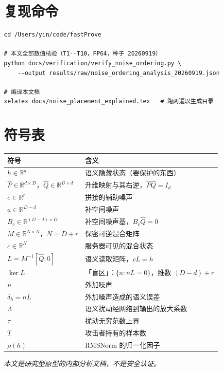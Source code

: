 \documentclass[UTF8, fontset=macnew, 11pt]{ctexart}
\newcommand{\kerL}{\ker L}
\newcommand{\Ph}{\hat P}
\newcommand{\Qh}{\hat Q}
\begin{document}
\appendix
\section{复现命令}\label{sec:repro}

\begin{verbatim}
cd /Users/yin/code/fastProve

# 本文全部数值核验（T1--T10，FP64，种子 20260919）
python docs/verification/verify_noise_ordering.py \
    --output results/raw/noise_ordering_analysis_20260919.json

# 编译本文档
xelatex docs/noise_placement_explained.tex   # 跑两遍以生成目录
\end{verbatim}

\section{符号表}

\begin{center}
\small
\renewcommand{\arraystretch}{1.25}
\begin{tabular}{@{}l l@{}}
\toprule
符号 & 含义 \\
\midrule
$h\in\mathbb R^d$ & 语义隐藏状态（要保护的东西） \\
$\Ph\in\mathbb R^{d\times D}$，$\Qh\in\mathbb R^{D\times d}$ & 升维映射与其右逆，$\Ph\Qh=I_d$ \\
$e\in\mathbb R^r$ & 拼接的辅助噪声 \\
$a\in\mathbb R^{D-d}$ & 补空间噪声 \\
$B_c\in\mathbb R^{(D-d)\times D}$ & 补空间噪声基，$B_c\Qh=0$ \\
$M\in\mathbb R^{N\times N}$，$N=D+r$ & 保密可逆混合矩阵 \\
$c\in\mathbb R^N$ & 服务器可见的混合状态 \\
$L=M^{-1}[\Qh;0]$ & 语义读取矩阵，$cL=h$ \\
$\kerL$ & 「盲区」：$\{n:nL=0\}$，维数 $(D-d)+r$ \\
$n$ & 外加噪声 \\
$\delta_h=nL$ & 外加噪声造成的语义误差 \\
$\Lambda$ & 语义扰动经网络到输出的放大系数 \\
$\tau$ & 扰动无穷范数上界 \\
$T$ & 攻击者持有的样本数 \\
$\rho(h)$ & RMSNorm 的归一化因子 \\
\bottomrule
\end{tabular}
\end{center}

\vfill
\begin{center}\small\itshape
本文是研究型原型的内部分析文档，不是安全认证。
\end{center}
\end{document}
